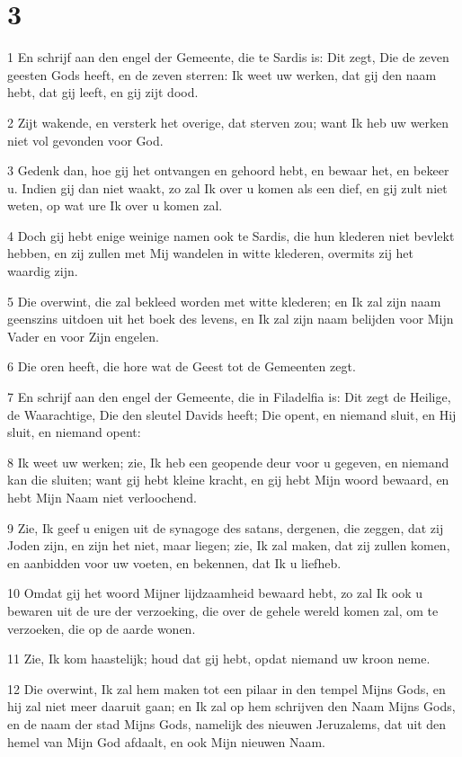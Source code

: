 \chapter{3}

\par 1 En schrijf aan den engel der Gemeente, die te Sardis is: Dit zegt, Die de zeven geesten Gods heeft, en de zeven sterren: Ik weet uw werken, dat gij den naam hebt, dat gij leeft, en gij zijt dood.
\par 2 Zijt wakende, en versterk het overige, dat sterven zou; want Ik heb uw werken niet vol gevonden voor God.
\par 3 Gedenk dan, hoe gij het ontvangen en gehoord hebt, en bewaar het, en bekeer u. Indien gij dan niet waakt, zo zal Ik over u komen als een dief, en gij zult niet weten, op wat ure Ik over u komen zal.
\par 4 Doch gij hebt enige weinige namen ook te Sardis, die hun klederen niet bevlekt hebben, en zij zullen met Mij wandelen in witte klederen, overmits zij het waardig zijn.
\par 5 Die overwint, die zal bekleed worden met witte klederen; en Ik zal zijn naam geenszins uitdoen uit het boek des levens, en Ik zal zijn naam belijden voor Mijn Vader en voor Zijn engelen.
\par 6 Die oren heeft, die hore wat de Geest tot de Gemeenten zegt.
\par 7 En schrijf aan den engel der Gemeente, die in Filadelfia is: Dit zegt de Heilige, de Waarachtige, Die den sleutel Davids heeft; Die opent, en niemand sluit, en Hij sluit, en niemand opent:
\par 8 Ik weet uw werken; zie, Ik heb een geopende deur voor u gegeven, en niemand kan die sluiten; want gij hebt kleine kracht, en gij hebt Mijn woord bewaard, en hebt Mijn Naam niet verloochend.
\par 9 Zie, Ik geef u enigen uit de synagoge des satans, dergenen, die zeggen, dat zij Joden zijn, en zijn het niet, maar liegen; zie, Ik zal maken, dat zij zullen komen, en aanbidden voor uw voeten, en bekennen, dat Ik u liefheb.
\par 10 Omdat gij het woord Mijner lijdzaamheid bewaard hebt, zo zal Ik ook u bewaren uit de ure der verzoeking, die over de gehele wereld komen zal, om te verzoeken, die op de aarde wonen.
\par 11 Zie, Ik kom haastelijk; houd dat gij hebt, opdat niemand uw kroon neme.
\par 12 Die overwint, Ik zal hem maken tot een pilaar in den tempel Mijns Gods, en hij zal niet meer daaruit gaan; en Ik zal op hem schrijven den Naam Mijns Gods, en de naam der stad Mijns Gods, namelijk des nieuwen Jeruzalems, dat uit den hemel van Mijn God afdaalt, en ook Mijn nieuwen Naam.
